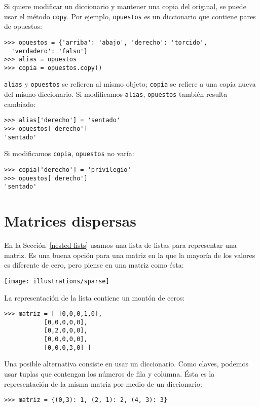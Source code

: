 Si quiere modificar un diccionario y mantener una copia del original,
se puede usar el método \texttt{copy}. Por ejemplo, \texttt{opuestos}
es un diccionario que contiene pares de opuestos:
\begin{lstlisting}
>>> opuestos = {'arriba': 'abajo', 'derecho': 'torcido', 
  'verdadero': 'falso'}
>>> alias = opuestos
>>> copia = opuestos.copy()
\end{lstlisting}

\texttt{alias} y \texttt{opuestos} se refieren al mismo objeto; \texttt{copia}
se refiere a una copia nueva del mismo diccionario. Si modificamos
\texttt{alias}, \texttt{opuestos} también resulta cambiado:
\begin{lstlisting}
>>> alias['derecho'] = 'sentado'
>>> opuestos['derecho']
'sentado'
\end{lstlisting}

Si modificamos \texttt{copia}, \texttt{opuestos} no varía:
\begin{lstlisting}
>>> copia['derecho'] = 'privilegio'
>>> opuestos['derecho']
'sentado'
\end{lstlisting}

\section{Matrices dispersas}

  

En la Sección~\ref{nested lists} usamos una lista de listas para
representar una matriz. Es una buena opción para una matriz en la
que la mayoría de los valores es diferente de cero, pero piense en
una matriz como ésta:

\beforefig\centerline{\texttt{[image: illustrations/sparse]}}

La representación de la lista contiene un montón de ceros:
\begin{lstlisting}
>>> matriz = [ [0,0,0,1,0],
           [0,0,0,0,0],
           [0,2,0,0,0],
           [0,0,0,0,0],
           [0,0,0,3,0] ]
\end{lstlisting}

Una posible alternativa consiste en usar un diccionario. Como claves,
podemos usar tuplas que contengan los números de fila y columna. Ésta
es la representación de la misma matriz por medio de un diccionario:
\begin{lstlisting}
>>> matriz = {(0,3): 1, (2, 1): 2, (4, 3): 3}
\end{lstlisting}

